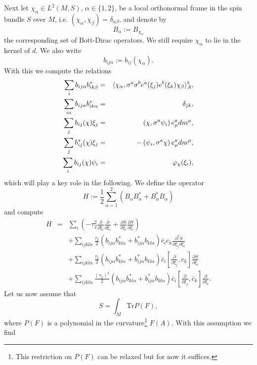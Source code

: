 \documentclass[letterpaper,11pt]{article}
\newcommand{\nn}{\nonumber}
\def\a{\alpha}
\def\b{\beta}
\def\d{\delta}
\def\m{\mu}
\newcommand{\pa}{\partial}
\begin{document}
Next let $\chi_\a\in L^2(M,S)$, $\a\in\{1,2\}$, be a local orthonormal frame in the spin bundle $S$ over $M$, i.e. $(\chi_\a, \chi_\b)= \d_{\a\b}$, and denote by
\begin{equation}
B_\a := B_{\chi_\a}
\label{simpleminds}
\end{equation}
the corresponding set of Bott-Dirac operators. We still require $\chi_\a$ to lie in the kernel of $d$. We also write
$$ b_{ij\a}:= b_{ij}(\chi_\a).$$
With this we compute the relations
\begin{eqnarray}
\sum_{i} b_{ij\a} b_{ik\b}^* &=&  \langle {\chi}_\a, \sigma^a \sigma^b e^a(\xi_j)  e^b(\xi_k)  \chi_\b \rangle_{A}^{\mbox{\tiny S}},
\label{K1}\\
\sum_{i\a} b_{ij\a} b_{ik\a}^*&=& \d_{jk}, 
\label{K3}\\
\sum_j b_{ij}(\chi)\xi_j &=& \left(\chi, \sigma^a   \psi_i  \right) e^a_\m  dm^\m ,
\label{K4}\\
\sum_j b^*_{ij}(\chi)\xi_j &=&- \left(   \psi_i, \sigma^a \chi   \right) e^a_\m  dm^\m ,
\label{K5}\\
\sum_i b_{ij}(\chi) \psi_i &=& \varphi_\chi(\xi_i),
\label{K6}
\end{eqnarray}
which will play a key role in the following. We define the operator
\begin{equation}
H:=\frac{1}{2}\sum_{\a=1}^2 \left( B_\a B_\a^*  +  B_\a^*B_\a  \right) 
\label{byraad}
\end{equation}
and compute
\begin{eqnarray}
H &=&  \sum_{i}    \left(  -\tau_2^2     \frac{\pa}{\pa\xi_{i }}  \frac{\pa}{\pa\xi_{i }}    
+  \frac{\pa S}{\pa \xi_i}\frac{\pa S}{\pa \xi_i}  \right)
\nn\\&&
+ \sum_{ijkl\a} \frac{\tau_2}{2} \left(  b_{ij\a} b_{kl\a}^*+ b_{ij\a}^* b_{kl\a} \right) \bar{c}_i   {c}_{k}    \frac{\pa^2 S}{\pa \xi_j\pa \xi_l } 
\nn\\&&
+ \sum_{ijkl\a} \frac{\tau_2}{2} \left(  b_{ij\a} b_{kl\a}^*+ b_{ij\a}^* b_{kl\a} \right) \bar{c}_i   \left[\frac{\pa}{\pa \xi_j }  , {c}_{k} \right]  \frac{\pa S}{\pa \xi_l }  
\nn\\&&
+ \sum_{ijkl\a} \frac{\left(\tau_2\right)^2}{2} \left(  b_{ij\a} b_{kl\a}^*+ b_{ij\a}^* b_{kl\a} \right) \bar{c}_i  \left[  \frac{\pa}{\pa \xi_j }  , \bar{c}_{k}\right]   \frac{\pa}{\pa \xi_l }     .
\label{b22}
\end{eqnarray}
%
%
%
%
Let us now assume that 
$$
S= \int_M \mbox{Tr}  P(F),
$$
where $P(F)$ is a polynomial in the curvature\footnote{This restriction on $P(F)$ can be relaxed but for now it suffices.} $F(A)$. With this assumption we find
\end{document}
